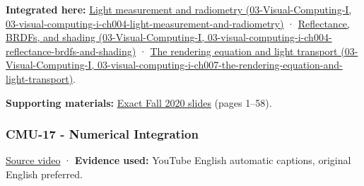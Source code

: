 \textbf{Integrated here:} \href{../03-Visual-Computing-I/main.pdf\#nameddest=03-visual-computing-i-ch004-light-measurement-and-radiometry}{Light measurement and radiometry (03-Visual-Computing-I, 03-visual-computing-i-ch004-light-measurement-and-radiometry)} · \href{../03-Visual-Computing-I/main.pdf\#nameddest=03-visual-computing-i-ch004-reflectance-brdfs-and-shading}{Reflectance, BRDFs, and shading (03-Visual-Computing-I, 03-visual-computing-i-ch004-reflectance-brdfs-and-shading)} · \href{../03-Visual-Computing-I/main.pdf\#nameddest=03-visual-computing-i-ch007-the-rendering-equation-and-light-transport}{The rendering equation and light transport (03-Visual-Computing-I, 03-visual-computing-i-ch007-the-rendering-equation-and-light-transport)}.

\textbf{Supporting materials:} \href{https://15462.courses.cs.cmu.edu/fall2020content/lectures/16_renderingequation/16_renderingequation_slides.pdf}{Exact Fall 2020 slides} (pages 1--58).

\subsubsection{CMU-17 - Numerical Integration}\label{04-visual-computing-ii-ch036-cmu-17---numerical-integration}

\href{https://www.youtube.com/watch?v=EGNZm9m382s}{Source video} · \textbf{Evidence used:} YouTube English automatic captions, original English preferred.

